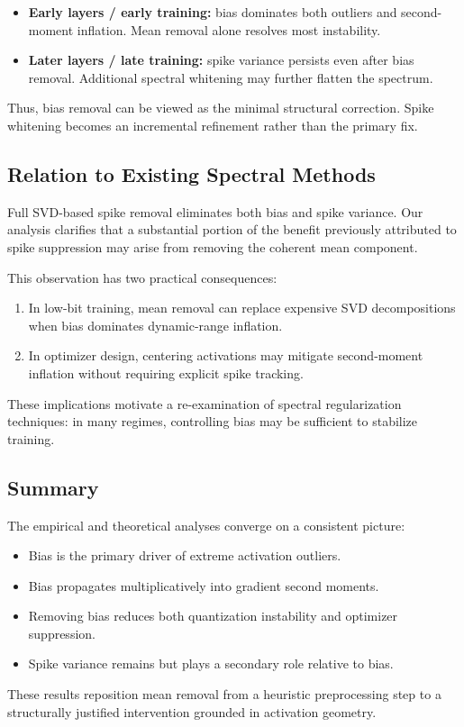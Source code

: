 \begin{itemize}
    \item \textbf{Early layers / early training:} bias dominates both
    outliers and second-moment inflation.
    Mean removal alone resolves most instability.
    
    \item \textbf{Later layers / late training:} spike variance persists even
    after bias removal.
    Additional spectral whitening may further flatten the spectrum.
\end{itemize}

Thus, bias removal can be viewed as the minimal structural correction.
Spike whitening becomes an incremental refinement rather than the primary fix.

\subsection{Relation to Existing Spectral Methods}

Full SVD-based spike removal eliminates both bias and spike variance.
Our analysis clarifies that a substantial portion of the benefit previously
attributed to spike suppression may arise from removing the coherent mean
component.

This observation has two practical consequences:

\begin{enumerate}
    \item In low-bit training, mean removal can replace expensive SVD
    decompositions when bias dominates dynamic-range inflation.
    
    \item In optimizer design, centering activations may mitigate second-moment
    inflation without requiring explicit spike tracking.
\end{enumerate}

These implications motivate a re-examination of spectral regularization
techniques: in many regimes, controlling bias may be sufficient to stabilize
training.

\subsection{Summary}

The empirical and theoretical analyses converge on a consistent picture:

\begin{itemize}
    \item Bias is the primary driver of extreme activation outliers.
    \item Bias propagates multiplicatively into gradient second moments.
    \item Removing bias reduces both quantization instability and optimizer
    suppression.
    \item Spike variance remains but plays a secondary role relative to bias.
\end{itemize}

These results reposition mean removal from a heuristic preprocessing step to a
structurally justified intervention grounded in activation geometry.